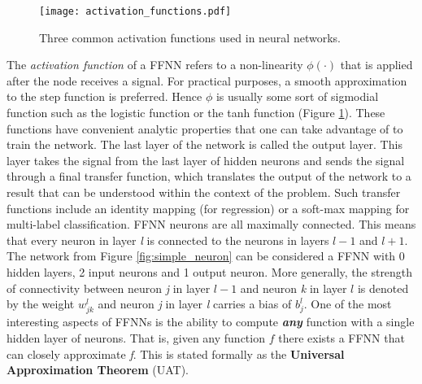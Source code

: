 \begin{figure}[!htb]
\centering
\texttt{[image: activation\_functions.pdf]}
\caption{Three common activation functions used in neural networks.}
\label{fig:act_fun}
\end{figure}

The \textit{activation function} of a FFNN refers to a non-linearity $\phi(\cdot)$ that is applied after the node receives a signal. For practical purposes, a smooth approximation to the step function is preferred. Hence $\phi$ is usually some sort of sigmodial function such as the logistic function or the tanh function (Figure \ref{fig:act_fun}). These functions have convenient analytic properties that one can take advantage of to train the network. The last layer of the network is called the output layer. This layer takes the signal from the last layer of hidden neurons and sends the signal through a final transfer function, which translates the output of the network to a result that can be understood within the context of the problem. Such transfer functions include an identity mapping (for regression) or a soft-max mapping for multi-label classification. FFNN neurons are all maximally connected. This means that every neuron in layer \textit{l} is connected to the neurons in layers $l - 1$ and $l + 1$. The network from Figure \ref{fig:simple_neuron} can be considered a FFNN with 0 hidden layers, 2 input neurons and 1 output neuron. More generally, the strength of connectivity between neuron \textit{j} in layer $l-1$ and neuron \textit{k} in layer $l$ is denoted by the weight $w^{l}_{jk}$ and neuron \textit{j} in layer \textit{l} carries a bias of $b^{l}_j$. One of the most interesting aspects of FFNNs is the ability to compute \textit{\textbf{any}} function with a single hidden layer of neurons. That is, given any function $f$ there exists a FFNN that can closely approximate \textit{f}. This is stated formally as the \textbf{Universal Approximation Theorem} (UAT).
